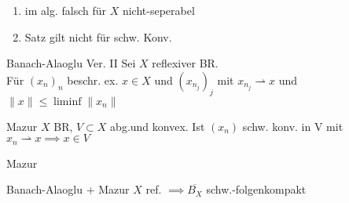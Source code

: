 \begin{bemerkung}
    \begin{enumerate}
        \item im alg. falsch für \(X\) nicht-seperabel
        \item Satz gilt nicht für schw. Konv.
    \end{enumerate}
\end{bemerkung}

\begin{satz}{Banach-Alaoglu Ver. II}
    Sei \(X\) reflexiver BR.\\ Für \((x_n)_n\) beschr. ex. \(x\in X\) und
    \((x_{n_j})_j\) mit \(x_{n_j} \rightharpoonup x\) und
    \(\|x\| \leq \liminf \|x_n\|\)
\end{satz}

\begin{satz}{Mazur}
    \(X\) BR, \(V\subset X\) abg.und konvex. Ist \((x_n)\) schw. konv. in V mit
    \(x_n \rightharpoonup x \implies x \in V\)
\end{satz}{Mazur}

\begin{satz}{Banach-Alaoglu + Mazur}
    \(X\) ref. \(\implies \overline{B_X}\) schw.-folgenkompakt
\end{satz}